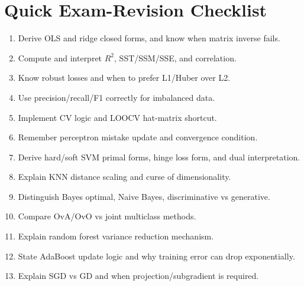 \documentclass[11pt]{article}
\newcommand{\1}{\mathbf{1}}
\begin{document}
\section{Quick Exam-Revision Checklist}
\begin{enumerate}
\item Derive OLS and ridge closed forms, and know when matrix inverse fails.
\item Compute and interpret $R^2$, SST/SSM/SSE, and correlation.
\item Know robust losses and when to prefer L1/Huber over L2.
\item Use precision/recall/F1 correctly for imbalanced data.
\item Implement CV logic and LOOCV hat-matrix shortcut.
\item Remember perceptron mistake update and convergence condition.
\item Derive hard/soft SVM primal forms, hinge loss form, and dual interpretation.
\item Explain KNN distance scaling and curse of dimensionality.
\item Distinguish Bayes optimal, Naive Bayes, discriminative vs generative.
\item Compare OvA/OvO vs joint multiclass methods.
\item Explain random forest variance reduction mechanism.
\item State AdaBoost update logic and why training error can drop exponentially.
\item Explain SGD vs GD and when projection/subgradient is required.
\end{enumerate}
\end{document}
